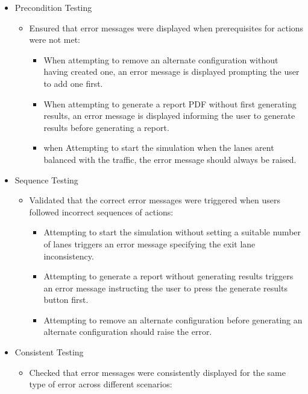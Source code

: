 \documentclass{article}
\begin{document}
        \begin{itemize}
            \item Precondition Testing
            \begin{itemize}
                \item Ensured that error messages were displayed when prerequisites for actions were not met:
                \begin{itemize}
                    \item When attempting to remove an alternate configuration without having created one, an error message is displayed prompting the user to add one first.
                    \item When attempting to generate a report PDF without first generating results, an error message is displayed informing the user to generate results before generating a report.
                    \item when Attempting to start the simulation when the lanes arent balanced with the traffic, the error message should always be raised.
                \end{itemize}
            \end{itemize}
            \item Sequence Testing
            \begin{itemize}
                \item Validated that the correct error messages were triggered when users followed incorrect sequences of actions:
                \begin{itemize}
                    \item Attempting to start the simulation without setting a suitable number of lanes triggers an error message specifying the exit lane inconsistency.
                    \item Attempting to generate a report without generating results triggers an error message instructing the user to press the generate results button first.
                    \item Attempting to remove an alternate configuration before generating an alternate configuration should raise the error.
                \end{itemize}
            \end{itemize}
            \item Consistent Testing
            \begin{itemize}
                \item Checked that error messages were consistently displayed for the same type of error across different scenarios:

\end{itemize}
\end{itemize}
\end{document}
